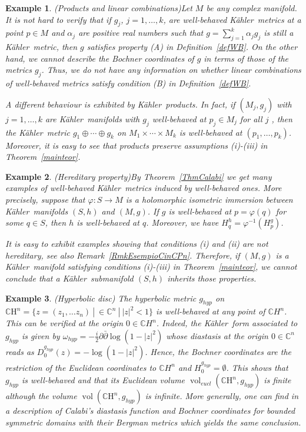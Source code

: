 \documentclass[12pt]{amsart}
\newcommand{\CH}{\mathbb{C}\mathrm{H}}
\newcommand{\C}{\mathbb{C}}
\newcommand{\K}{K\"{a}hler}
\newcommand{\vol}{{\operatorname{vol}}}
\newtheorem{ex}{Example}
\begin{document}
\begin{ex}\rm (Products and linear combinations)\label{opwb}
	Let $M$ be any complex manifold.
	It is not hard to verify that if $g_j$, $j=1, \dots ,k$, are well-behaved \K\ metrics at a point $p\in M$ and  $\alpha_j$ are positive real  numbers such that $g=\sum_{j=1}^k\alpha_jg_j$ is still a \K\ metric,  then $g$ satisfies property (A) in Definition~\ref{defWB}. 
	On the other hand, we cannot describe the Bochner coordinates of $g$ in terms of those of the metrics $g_j$. Thus, we do not have any information on whether linear combinations of well-behaved metrics satisfy condition (B) in Definition~\ref{defWB}. 
	
	A  different behaviour is exhibited by \K\ products.
	In fact, if $(M_j, g_j)$ with $j=1, \dots ,k$ are \K\ manifolds with $g_j$
	well-behaved at $p_j\in M_j$ for all $j$ , then the \K\ metric $g_1\oplus\cdots\oplus g_k$ 
	on $M_1\times\cdots \times M_k$ is  well-behaved at $(p_1, \dots, p_k)$. 
	Moreover, it is easy to see that products preserve assumptions (i)-(iii) in Theorem~\ref{mainteor}.
\end{ex}

\begin{ex}\rm (Hereditary property)\label{hered}
	By  Theorem~\ref{ThmCalabi}  we get many examples of well-behaved \K\ metrics induced by well-behaved ones.  More precisely, suppose that $\varphi: S\rightarrow M$ is a holomorphic isometric immersion  between \K\ manifolds $(S,  h)$ and $(M, g)$. If $g$ is well-behaved at $p=\varphi (q)$ for some $q\in S$,  then $h$ is well-behaved at $q$. Moreover, we have $H_q^h=\varphi^{-1}(H^g_{p})$.
	
	It is easy to exhibit examples showing that conditions (i) and (ii) are not hereditary, see also Remark~\ref{RmkEsempioCinCPn}. 
	Therefore, if $(M, g)$ is a \K\ manifold satisfying conditions (i)-(iii) in Theorem~\ref{mainteor}, we cannot conclude that a \K\ submanifold $(S,  h)$ inherits those properties.
\end{ex}

\begin{ex}\rm\label{hypmet} (Hyperbolic disc)
	The hyperbolic metric $g_{hyp}$ on $\CH^n=\{z=(z_1, \dots z_n) \ | \ \in \C^n \ |\ |z|^2<1\}$ is well-behaved at 
	any point of $\C H^n$.
	This can be verified at the origin $0\in \C H^n$.
	Indeed, the  \K\ form  associated to $g_{hyp}$ is given by $\omega_{hyp}=-\frac{i}{2}\partial\bar\partial\log (1-|z|^2)$ whose diastasis at the origin $0\in\C^n$ reads as $D_0^{g_{hyp}}(z)=-\log (1-|z|^2)$. 
	Hence, the Bochner coordinates are the restriction of the Euclidean coordinates to $\C H^n$ and $H_0^{g_{hyp}}=\emptyset$. 
This shows that $g_{hyp}$ is well-behaved and that its Euclidean volume $\vol_{eucl}(\CH^n,g_{hyp})$ is finite although the volume $\vol(\CH^n,g_{hyp})$ is infinite.
	More generally, one can find  in \cite{DiScalaLoi07SymmetricSpaces} a description of Calabi's diastasis function and Bochner coordinates for bounded symmetric domains with their Bergman metrics which yields the same conclusion.
\end{ex}
\end{document}
